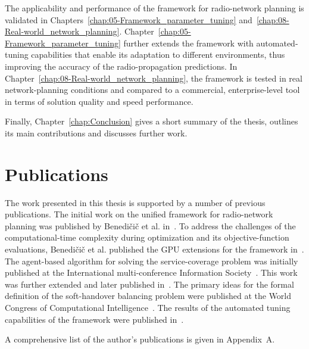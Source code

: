 The applicability and performance of the framework for radio-network
planning is validated in Chapters~\ref{chap:05-Framework_parameter_tuning}
and~\ref{chap:08-Real-world_network_planning}. Chapter~\ref{chap:05-Framework_parameter_tuning}
further extends the framework with automated-tuning capabilities that
enable its adaptation to different environments, thus improving the
accuracy of the radio-propagation predictions. In Chapter~\ref{chap:08-Real-world_network_planning},
the framework is tested in real network-planning conditions and compared
to a commercial, enterprise-level tool in terms of solution quality
and speed performance.

Finally, Chapter~\ref{chap:Conclusion} gives a short summary of
the thesis, outlines its main contributions and discusses further
work.


\section{Publications }

The work presented in this thesis is supported by a number of previous
publications. The initial work on the unified framework for radio-network
planning was published by Benedi\v{c}i\v{c} et al. in~\cite{Benedicic-A_GRASS_GIS_parallel_module_for_radio-propagation_predictions:2013}.
To address the challenges of the computational-time complexity during
optimization and its objective-function evaluations, Benedi\v{c}i\v{c}
et al. published the GPU extensions for the framework in~\cite{Benedicic-A_GPU_based_parallel_agent_optimization_approach:2013}.
The agent-based algorithm for solving the service-coverage problem
was initially published at the International multi-conference Information
Society~\cite{Benedicic_Pilot.power.optimization:2010}. This work
was further extended and later published in~\cite{Benedicic-A_GPU_based_parallel_agent_optimization_approach:2013}.
The primary ideas for the formal definition of the soft-handover balancing
problem were published at the World Congress of Computational Intelligence~\cite{Benedicic_Balancing_downlink_uplink_soft_handover_areas_in_UMTS_networks:2012}.
The results of the automated tuning capabilities of the framework
were published in~\cite{Benedicic-An_adaptable_parallel_simulation_framework_for_LTE_coverage_planning:2013}.

A comprehensive list of the author's publications is given in Appendix~A.
